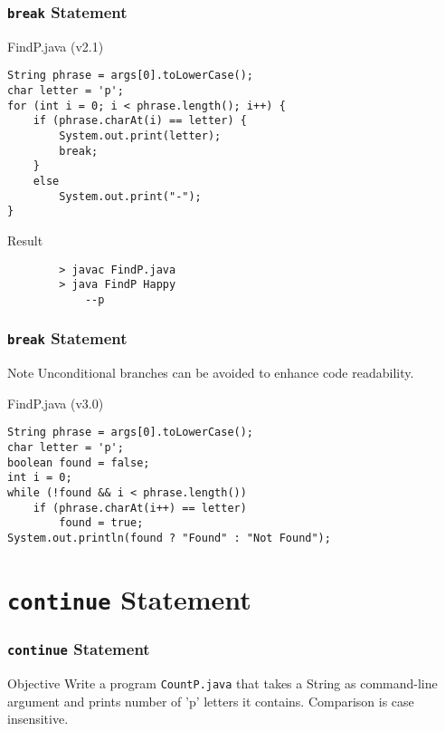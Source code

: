 \documentclass[10pt, compress]{beamer}
\begin{document}
\begin{frame}[fragile]
	\frametitle{\texttt{break} Statement}
	\begin{block}{FindP.java (v2.1)}
		\begin{verbatim}
String phrase = args[0].toLowerCase();
char letter = 'p';
for (int i = 0; i < phrase.length(); i++) {
	if (phrase.charAt(i) == letter) {
		System.out.print(letter);
		break;
	}
	else
		System.out.print("-");
}
		\end{verbatim}
	\end{block}
	\begin{block}{Result}
		\begin{verbatim}
		> javac FindP.java
		> java FindP Happy
			--p
		\end{verbatim}
	\end{block}
\end{frame}

\begin{frame}[fragile]
	\frametitle{\texttt{break} Statement}
	\begin{block}{Note}
	Unconditional branches can be avoided to enhance code readability.
	\end{block}
	\begin{block}{FindP.java (v3.0)}
		\begin{verbatim}
String phrase = args[0].toLowerCase();
char letter = 'p';
boolean found = false;
int i = 0;
while (!found && i < phrase.length())
	if (phrase.charAt(i++) == letter)
		found = true;
System.out.println(found ? "Found" : "Not Found");
		\end{verbatim}
	\end{block}
\end{frame}

\section{\texttt{continue} Statement}

\begin{frame}[fragile]
	\frametitle{\texttt{continue} Statement}
	\begin{block}{Objective}
		Write a program \texttt{CountP.java} that takes a String as command-line argument and prints number of 'p' letters it contains. Comparison is case insensitive.
	\end{block}
\end{frame}
\end{document}
